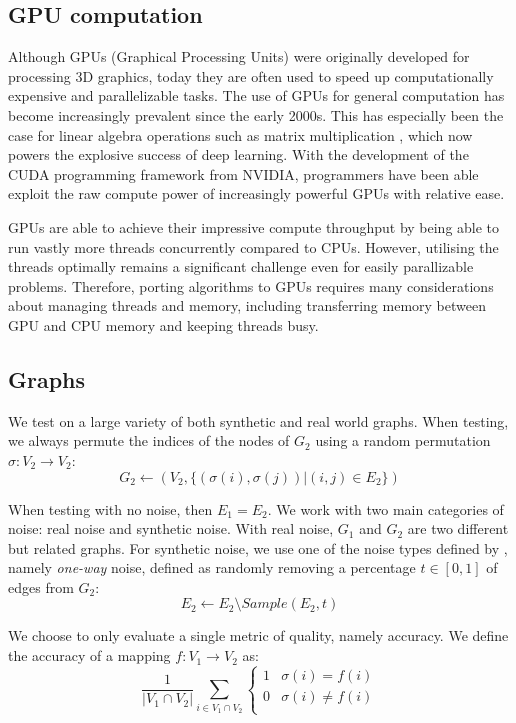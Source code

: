 \subsection{GPU computation}
Although GPUs (Graphical Processing Units) were originally developed for processing 3D graphics, today they are often used to speed up computationally expensive and parallelizable tasks. The use of GPUs for general computation has become increasingly prevalent since the early 2000s. This has especially been the case for linear algebra operations such as matrix multiplication \citep{gpgpu2007}, which now powers the explosive success of deep learning. With the development of the CUDA programming framework from NVIDIA, programmers have been able exploit the raw compute power of increasingly powerful GPUs with relative ease.

GPUs are able to achieve their impressive compute throughput by being able to run vastly more threads concurrently compared to CPUs. However, utilising the threads optimally remains a significant challenge even for easily parallizable problems. Therefore, porting algorithms to GPUs requires many considerations about managing threads and memory, including transferring memory between GPU and CPU memory and keeping threads busy.

\subsection{Graphs}
We test on a large variety of both synthetic and real world graphs. When testing, we always permute the indices of the nodes of $G_2$ using a random permutation $\sigma : V_2 \rightarrow V_2$:
\begin{equation}
    G_2 \gets (V_2, \{ (\sigma(i), \sigma(j)) \vert (i, j) \in E_2 \})    
\end{equation}

When testing with no noise, then $E_1 = E_2$. We work with two main categories of noise: real noise and synthetic noise. With real noise, $G_1$ and $G_2$ are two different but related graphs. For synthetic noise, we use one of the noise types defined by \cite{skitsas2023GAEval}, namely \textit{one-way} noise, defined as randomly removing a percentage $t \in [0, 1]$ of edges from $G_2$:
\begin{equation}
    E_2 \gets E_2 \setminus \textit{Sample}(E_2, t)
\end{equation}

We choose to only evaluate a single metric of quality, namely accuracy. We define the accuracy of a mapping $f : V_1 \rightarrow V_2$ as:
\begin{equation}
    \frac{1}{|V_1 \cap V_2|} \sum_{i \in V_1 \cap V_2} \begin{cases}
        1 & \sigma(i) = f(i)\\
        0 & \sigma(i) \neq f(i)\\
    \end{cases} 
\end{equation}

